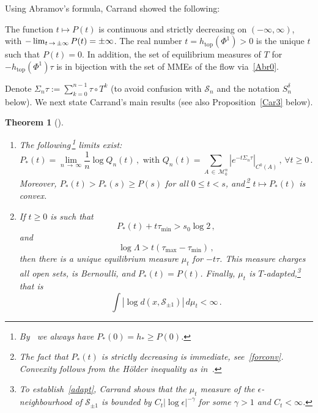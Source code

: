 \documentclass[10pt]{amsart}
\newtheorem{theo}{Theorem}[section]
\theoremstyle{definition}\newtheorem{defi}[theo]{Definition}\newtheorem{rema}[theo]{Remark}\newtheorem{exam}[theo]{Example}\newtheorem{exem}[theo]{Example}\newtheorem{nota}[theo]{Notation}
\newcommand{\MM}{\mathcal{M}}
\newcommand{\cS}{\mathcal{S}}
\newcommand{\htop}{h_{\scriptstyle{\text{top}}}}
\newcommand*{\alphenumi}{\renewcommand*{\theenumi}{\alph{enumi}}}
\let\oldforall\forall
\renewcommand*{\forall}{\mathrel{\oldforall}}
\begin{document}
Using Abramov's formula, Carrand showed the following:


\begin{prop}\label{Car2}
The function $t\mapsto P(t)$ is continuous and strictly decreasing on $(-\infty, \infty)$, with $-\lim_{t\,\to\,\pm \infty}P(t)\linebreak =\pm\infty$. The real number $t=\htop(\Phi^1)>0$ is the unique $t$ such that $P(t)=0$. In addition, the set of equilibrium measures of $T$ for $-\htop(\Phi^1)\tau$ is in bijection with the set of MMEs of the flow via~\eqref{Abr0}.
\end{prop}


Denote $\Sigma_n \tau:=\sum_{k=0}^{n-1} \tau\circ T^k$ (to avoid confusion with $\cS_n$ and the notation $S^\delta_n$ below). We next state Carrand's main results (see also Proposition~\ref{Car3} below).

\begin{theo}[{\cite[Theorem~2.1, Theorem~1.2]{Ca}}]\label{Car}\leavevmode
\begin{enumerate}\alphenumi
\item\label{theo1.2.a} The following\,\footnote{By~\cite{BD1} we always have $P_*(0)=h_*\ge P(0)$.} limits exist:
\[
P_*(t)=\lim_{n\,\to\,\infty} \frac 1 n \log Q_n(t)\,,
\text{ with } Q_n(t)= \sum_{A\,\in\,\MM_0^n} \left|e^{-t\Sigma_n \tau}\right|_{C^0(A)}\,,\,
\forall t\ge 0\,.
\]
Moreover, $P_*(t)> P_*(s)\ge P(s)$ for all $0\le t < s$, and\,\footnote{The fact that $P_*(t)$ is strictly decreasing is immediate, see~\eqref{forconv}. Convexity follows from the H\"older inequality as in~\cite[Proposition~2.6]{BD2}.} $t\mapsto P_*(t)$ is convex.

\item\label{theo1.2.b} If $t\ge 0$ is such that
\begin{equation}\label{sparse}
P_*(t)+ t \tau_{\min} > s_0 \log 2 \,,
\end{equation}
and
\begin{equation}\label{hassle}
\log \Lambda > t (\tau_{\max}-\tau_{\min})\,,
\end{equation}
then there is a unique equilibrium measure $\mu_t$ for $-t\tau$. This measure charges all open sets, is Bernoulli, and $P_*(t)=P(t)$. Finally, $\mu_t$ is $T$-adapted,\footnote{\label{foot:adapt}
To establish~\eqref{adapt}, Carrand shows that the $\mu_t$ measure of the $\epsilon$-neighbourhood of $\cS_{\pm 1}$ is bounded by $C_t |\log \epsilon|^{ - \gamma}$ for some $\gamma >1$ and $C_t<\infty$.} that is
\begin{equation}\label{adapt}
\int \left|\log d(x, \cS_{\pm 1})\right| \, d\mu_t<\infty\,.
\end{equation}
\end{enumerate}
\end{theo}
\end{document}
